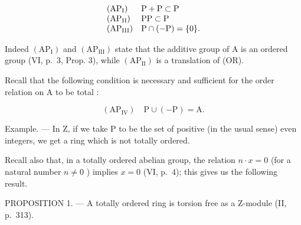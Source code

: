 \[
\begin{array}{l l} \left(\mathrm{AP} _ {\mathrm{I}}\right) & \mathrm{P} + \mathrm{P} \subset \mathrm{P} \\ \left(\mathrm{AP} _ {\mathrm{II}}\right) & \mathrm{PP} \subset \mathrm{P} \\ \left(\mathrm{AP} _ {\mathrm{III}}\right) & \mathrm{P} \cap (- \mathrm{P}) = \{0 \}. \end{array}
\]

Indeed \((\mathrm{AP}_{\mathrm{I}})\) and \((\mathrm{AP}_{\mathrm{III}})\) state that the additive group of A is an ordered group (VI, p.~3, Prop. 3), while \((\mathrm{AP}_{\mathrm{II}})\) is a translation of (OR).

Recall that the following condition is necessary and sufficient for the order relation on A to be total :

\[
\left(\mathrm{AP} _ {\mathrm{IV}}\right) \quad \mathrm{P} \cup (- \mathrm{P}) = \mathrm{A}.
\]

Example. --- In Z, if we take P to be the set of positive (in the usual sense) even integers, we get a ring which is not totally ordered.

Recall also that, in a totally ordered abelian group, the relation \(n \cdot x = 0\) (for a natural number \(n \neq 0\) ) implies \(x = 0\) (VI, p.~4); this gives us the following result.

PROPOSITION 1. --- A totally ordered ring is torsion free as a Z-module (II, p.~313).

